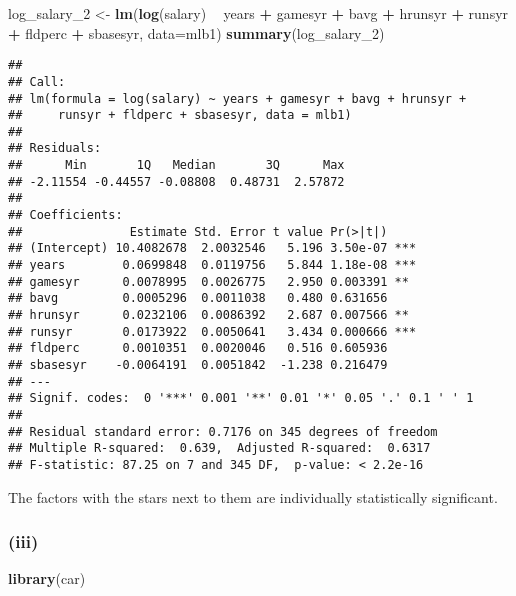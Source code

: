 \documentclass[
]{article}
\newenvironment{Shaded}{\begin{snugshade}}{\end{snugshade}}
\newcommand{\DataTypeTok}[1]{\textcolor[rgb]{0.13,0.29,0.53}{#1}}
\newcommand{\DecValTok}[1]{\textcolor[rgb]{0.00,0.00,0.81}{#1}}
\newcommand{\KeywordTok}[1]{\textcolor[rgb]{0.13,0.29,0.53}{\textbf{#1}}}
\newcommand{\NormalTok}[1]{#1}
\newcommand{\OperatorTok}[1]{\textcolor[rgb]{0.81,0.36,0.00}{\textbf{#1}}}
\newcommand{\StringTok}[1]{\textcolor[rgb]{0.31,0.60,0.02}{#1}}
\begin{document}
\begin{Shaded}
\begin{Highlighting}[]
\NormalTok{log_salary_}\DecValTok{2}\NormalTok{ <-}\StringTok{ }\KeywordTok{lm}\NormalTok{(}\KeywordTok{log}\NormalTok{(salary) }\OperatorTok{~}\StringTok{ }\NormalTok{years }\OperatorTok{+}\StringTok{ }\NormalTok{gamesyr }\OperatorTok{+}\StringTok{ }\NormalTok{bavg }\OperatorTok{+}\StringTok{ }\NormalTok{hrunsyr}
                   \OperatorTok{+}\StringTok{ }\NormalTok{runsyr }\OperatorTok{+}\StringTok{ }\NormalTok{fldperc }\OperatorTok{+}\StringTok{ }\NormalTok{sbasesyr, }\DataTypeTok{data=}\NormalTok{mlb1)}
\KeywordTok{summary}\NormalTok{(log_salary_}\DecValTok{2}\NormalTok{)}
\end{Highlighting}
\end{Shaded}

\begin{verbatim}
## 
## Call:
## lm(formula = log(salary) ~ years + gamesyr + bavg + hrunsyr + 
##     runsyr + fldperc + sbasesyr, data = mlb1)
## 
## Residuals:
##      Min       1Q   Median       3Q      Max 
## -2.11554 -0.44557 -0.08808  0.48731  2.57872 
## 
## Coefficients:
##               Estimate Std. Error t value Pr(>|t|)    
## (Intercept) 10.4082678  2.0032546   5.196 3.50e-07 ***
## years        0.0699848  0.0119756   5.844 1.18e-08 ***
## gamesyr      0.0078995  0.0026775   2.950 0.003391 ** 
## bavg         0.0005296  0.0011038   0.480 0.631656    
## hrunsyr      0.0232106  0.0086392   2.687 0.007566 ** 
## runsyr       0.0173922  0.0050641   3.434 0.000666 ***
## fldperc      0.0010351  0.0020046   0.516 0.605936    
## sbasesyr    -0.0064191  0.0051842  -1.238 0.216479    
## ---
## Signif. codes:  0 '***' 0.001 '**' 0.01 '*' 0.05 '.' 0.1 ' ' 1
## 
## Residual standard error: 0.7176 on 345 degrees of freedom
## Multiple R-squared:  0.639,  Adjusted R-squared:  0.6317 
## F-statistic: 87.25 on 7 and 345 DF,  p-value: < 2.2e-16
\end{verbatim}

The factors with the stars next to them are individually statistically
significant.

\hypertarget{iii-3}{%
\subsubsection{(iii)}\label{iii-3}}

\begin{Shaded}
\begin{Highlighting}[]
\KeywordTok{library}\NormalTok{(car)}
\end{Highlighting}
\end{Shaded}
\end{document}
